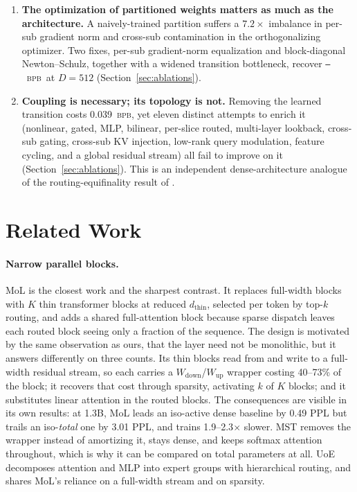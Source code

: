 \documentclass{article}
\newcommand{\PH}{{\color{red}\texttt{--}}}   %
\newcommand{\bpb}{\textsc{bpb}}
\newcommand{\dmodel}{D}
\begin{document}
\begin{enumerate}
\item \textbf{The optimization of partitioned weights matters as much as the
architecture.} A naively-trained partition suffers a $7.2\times$ imbalance in
per-sub gradient norm and cross-sub contamination in the orthogonalizing
optimizer. Two fixes, per-sub gradient-norm equalization and block-diagonal
Newton--Schulz, together with a widened transition bottleneck, recover
\PH~\bpb\ at $\dmodel{=}512$ (Section~\ref{sec:ablations}).

\item \textbf{Coupling is necessary; its topology is not.} Removing the learned
transition costs 0.039~\bpb, yet eleven distinct attempts to enrich it
(nonlinear, gated, MLP, bilinear, per-slice routed, multi-layer lookback,
cross-sub gating, cross-sub KV injection, low-rank query modulation, feature
cycling, and a global residual stream) all fail to improve on it
(Section~\ref{sec:ablations}). This is an independent dense-architecture analogue
of the routing-equifinality result of \citet{ternovtsii2026equifinality}.
\end{enumerate}

\section{Related Work}

\paragraph{Narrow parallel blocks.} MoL \citep{ternovtsii2026mol} is the closest
work and the sharpest contrast. It replaces full-width blocks with $K$ thin
transformer blocks at reduced $d_{\text{thin}}$, selected per token by top-$k$
routing, and adds a shared full-attention block because sparse dispatch leaves
each routed block seeing only a fraction of the sequence. The design is motivated
by the same observation as ours, that the layer need not be monolithic, but it
answers differently on three counts. Its thin blocks read from and write to a
full-width residual stream, so each carries a $W_{\text{down}}$/$W_{\text{up}}$
wrapper costing 40--73\% of the block; it recovers that cost through sparsity,
activating $k$ of $K$ blocks; and it substitutes linear attention in the routed
blocks. The consequences are visible in its own results: at 1.3B, MoL leads an
iso-active dense baseline by 0.49 PPL but trails an iso-\emph{total} one by 3.01
PPL, and trains 1.9--2.3$\times$ slower. MST removes the wrapper instead of
amortizing it, stays dense, and keeps softmax attention throughout, which is why
it can be compared on total parameters at all. UoE \citep{yang2025uoe}
decomposes attention and MLP into expert groups with hierarchical routing, and
shares MoL's reliance on a full-width stream and on sparsity.
\end{document}

